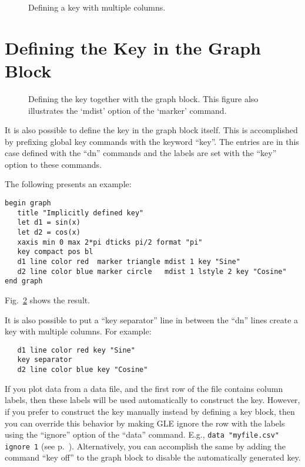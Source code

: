 \begin{figure}[tb]
\centering
\mbox{}
\caption{\label{multicolkey:fig}Defining a key with multiple columns.}
\end{figure}

\section{Defining the Key in the Graph Block}\label{kgrb:sec}

\begin{figure}[tb]
\centering
\mbox{}
\caption{\label{grkey:fig}Defining the key together with the graph block. This figure also illustrates the `mdist' option of the `marker' command.}
\end{figure}

It is also possible to define the key in the graph block itself. This is accomplished by prefixing global key commands with the keyword ``key''. The entries are in this case defined with the ``dn'' commands and the labels are set with the ``key'' option to these commands.

The following presents an example:

\preglecode{}
\begin{Verbatim}
begin graph
   title "Implicitly defined key"
   let d1 = sin(x)
   let d2 = cos(x)
   xaxis min 0 max 2*pi dticks pi/2 format "pi"
   key compact pos bl
   d1 line color red  marker triangle mdist 1 key "Sine"
   d2 line color blue marker circle   mdist 1 lstyle 2 key "Cosine"
end graph
\end{Verbatim}
\postglecode{}

\noindent{}Fig.~\ref{grkey:fig} shows the result.

It is also possible to put a ``key separator'' line in between the ``dn'' lines create a key with multiple columns. For example:

\preglecode{}
\begin{Verbatim}
   d1 line color red key "Sine"
   key separator
   d2 line color blue key "Cosine"
\end{Verbatim}
\postglecode{}

If you plot data from a data file, and the first row of the file contains column labels, then these labels will be used automatically to construct the key. However, if you prefer to construct the key manually instead by defining a key block, then you can override this behavior by making GLE ignore the row with the labels using the ``ignore'' option of the ``data'' command. E.g., \verb+data "myfile.csv" ignore 1+ (see p.~\pageref{opt:ignore}). Alternatively, you can accomplish the same by adding the command ``key off'' to the graph block to disable the automatically generated key.




